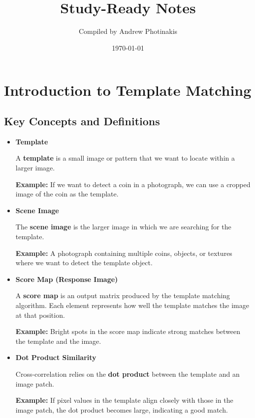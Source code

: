 \documentclass[12pt]{article}
\title{\TOPICTITLE\\\large Study-Ready Notes}
\author{Compiled by Andrew Photinakis}
\date{\today}
\begin{document}
\maketitle
\tableofcontents
\newpage

\section{Introduction to Template Matching}

\subsection{Key Concepts and Definitions}

\begin{itemize}

    \item \textbf{Template}

          A \textbf{template} is a small image or pattern that we want to locate within a larger image.

          \textbf{Example:}
          If we want to detect a coin in a photograph, we can use a cropped image of the coin as the template.

    \item \textbf{Scene Image}

          The \textbf{scene image} is the larger image in which we are searching for the template.

          \textbf{Example:}
          A photograph containing multiple coins, objects, or textures where we want to detect the template object.

    \item \textbf{Score Map (Response Image)}

          A \textbf{score map} is an output matrix produced by the template matching algorithm. Each element represents how well the template matches the image at that position.

          \textbf{Example:}
          Bright spots in the score map indicate strong matches between the template and the image.

    \item \textbf{Dot Product Similarity}

          Cross-correlation relies on the \textbf{dot product} between the template and an image patch.

          \textbf{Example:}
          If pixel values in the template align closely with those in the image patch, the dot product becomes large, indicating a good match.

\end{itemize}
\end{document}
